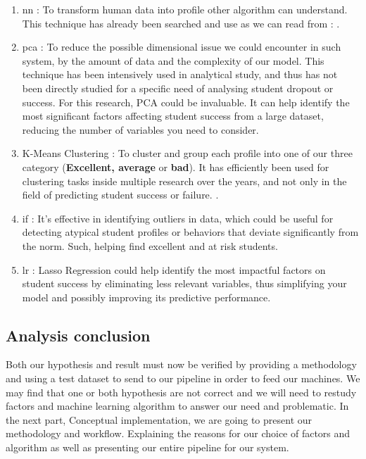 \documentclass[../main.tex]{subfiles}
\begin{document}
\begin{enumerate}
    \item \acrfull{nn} : To transform human data into profile other algorithm can understand. This technique has already been searched and use as we can read from : \cite{m_alban_she_is_with_the_faculty_of_engineering_and_applied_sciences_of_the_technical_university_cotopaxi_neural_2019, siri_predicting_2015, viloria_integration_2019, zhang_neural_2000}.
    \item \acrfull{pca} : To reduce the possible dimensional issue we could encounter in such system, by the amount of data and the complexity of our model. This technique has been intensively used in analytical study, and thus has not been directly studied for a specific need of analysing student dropout or success. For this research, PCA could be invaluable. It can help identify the most significant factors affecting student success from a large dataset, reducing the number of variables you need to consider.
    \item K-Means Clustering : To cluster and group each profile into one of our three category (\textbf{Excellent, average} or \textbf{bad}). It has efficiently been used for clustering tasks inside multiple research over the years, and not only in the field of predicting student success or failure. \cite{de_o_santos_supervised_2019, mardolkar_forecasting_2020,shiful_machine_2021}.
    \item \acrfull{if} : It's effective in identifying outliers in data, which could be useful for detecting atypical student profiles or behaviors that deviate significantly from the norm. Such, helping find excellent and at risk students.
    \item \acrfull{lr} : Lasso Regression could help identify the most impactful factors on student success by eliminating less relevant variables, thus simplifying your model and possibly improving its predictive performance. 
\end{enumerate}


\subsection{Analysis conclusion}
\label{subsec:analysis_conclusion}
Both our hypothesis and result must now be verified by providing a methodology and using a test dataset to send to our pipeline in order to feed our machines.
We may find that one or both hypothesis are not correct and we will need to restudy factors and machine learning algorithm to answer our need and problematic. 
In the next part, Conceptual implementation, we are going to present our methodology and workflow. Explaining the reasons for our choice of factors and algorithm as well as presenting our entire pipeline for our system.
\end{document}
